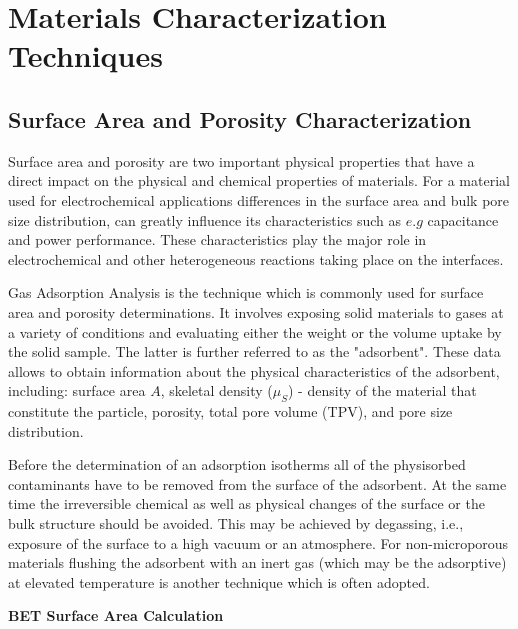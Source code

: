 


\section{Materials Characterization Techniques}
\subsection{Surface Area and Porosity Characterization}

Surface area and porosity are two important physical properties that have a direct impact on the physical and chemical properties of materials. For a material used for electrochemical applications differences in the surface area and bulk pore size distribution, can greatly influence its characteristics such as $e.g$ capacitance and power performance. These characteristics play the major role in electrochemical and other heterogeneous reactions taking place on the interfaces.

Gas Adsorption Analysis is the technique which is commonly used for surface area and porosity determinations. It involves exposing solid materials to gases at a variety of conditions and evaluating either the weight or the volume uptake by the solid sample. The latter is further referred to as the "adsorbent". These data allows to obtain information about the physical characteristics of the adsorbent, including: surface area $A$, skeletal density ($\mu_S$) - density of the material that constitute the particle, porosity, total pore volume (TPV), and pore size distribution.

Before the determination of an adsorption isotherms all of the physisorbed contaminants have to be removed from the surface of the adsorbent. At the same time the irreversible chemical as well as physical changes of the surface or the bulk structure should be avoided. This may be achieved by degassing, i.e., exposure of the surface to a high vacuum or an atmosphere. For non-microporous materials flushing the adsorbent with an inert gas (which may be the adsorptive) at elevated temperature is another technique which is often adopted. 

\medskip
\textbf{BET Surface Area Calculation}

